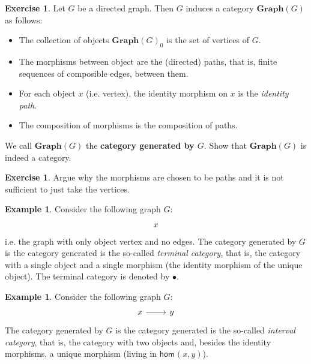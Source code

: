 \documentclass[a4paper,10pt]{scrartcl}
\theoremstyle{plain}
\theoremstyle{definition}
\newtheorem{exa}[thm]{Example}
\newtheorem{exer}[thm]{Exercise}
\newcommand{\cfont}[1]{\ensuremath{\mathsf{#1}}}
\newcommand{\Ob}[1]{{#1}_0}
\newcommand{\Hom}[3][]{\cfont{hom}_{#1}(#2,#3)}
\begin{document}
\begin{exer} Let $G$ be a directed graph. Then $G$ induces a category $\mathbf{Graph}(G)$ as follows:
\begin{itemize}
\item The collection of objects $\Ob{\mathbf{Graph}(G)}$ is the set of vertices of $G$. 
\item The morphisms between object are the (directed) paths, that is, finite sequences of composible edges, between them.
\item For each object $x$ (i.e. vertex), the identity morphism on $x$ is the \textit{identity path}.
\item The composition of morphisms is the composition of paths.
\end{itemize}
We call $\mathbf{Graph}(G)$ the \textbf{category generated by $G$}. Show that $\mathbf{Graph}(G)$ is indeed a category.
\end{exer}

\begin{exer} Argue why the morphisms are chosen to be paths and it is not sufficient to just take the vertices. 
\end{exer}

\begin{exa}\label{exa:graph_terminalcat} Consider the following graph $G$:
\[
\begin{tikzcd}
x
\end{tikzcd}
\]
i.e. the graph with only object vertex and no edges. The category generated by $G$ is the category generated is the so-called \textit{terminal category}, that is, the category with a single object and a single morphism (the identity morphism of the unique object). 
The terminal category is denoted by $\bullet$.
\end{exa}

\begin{exa}\label{exa:graph_intervalcat} Consider the following graph $G$:
\[
\begin{tikzcd}
x \arrow[r] & y
\end{tikzcd}
\]
The category generated by $G$ is the category generated is the so-called \textit{interval category}, that is, the category with two objects and, besides the identity morphisms, a unique morphism (living in $\Hom{x}{y}$).
\end{exa}
\end{document}
